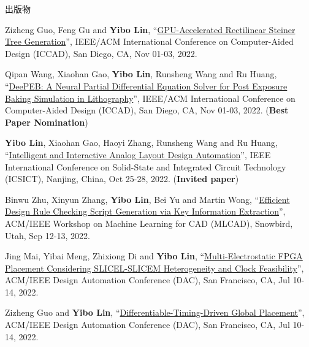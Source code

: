 \begin{rSection}{出版物}
\begin{description}[font=\normalfont, rightmargin=2em]
{}
            

\item[{[C69]}]{
        Zizheng Guo, Feng Gu and \textbf{Yibo Lin}, 
    ``\href{https://doi.org/10.1145/3508352.3549434}{GPU-Accelerated Rectilinear Steiner Tree Generation}'', 
    IEEE/ACM International Conference on Computer-Aided Design (ICCAD), San Diego, CA, Nov 01-03, 2022.
    
}
            

\item[{[C68]}]{
        Qipan Wang, Xiaohan Gao, \textbf{Yibo Lin}, Runsheng Wang and Ru Huang, 
    ``\href{https://doi.org/10.1145/3508352.3549398}{DeePEB: A Neural Partial Differential Equation Solver for Post Exposure Baking Simulation in Lithography}'', 
    IEEE/ACM International Conference on Computer-Aided Design (ICCAD), San Diego, CA, Nov 01-03, 2022.
    (\textbf{Best Paper Nomination})
}
            

\item[{[C67]}]{
        \textbf{Yibo Lin}, Xiaohan Gao, Haoyi Zhang, Runsheng Wang and Ru Huang, 
    ``\href{https://doi.org/10.1109/ICSICT55466.2022.9963217}{Intelligent and Interactive Analog Layout Design Automation}'', 
    IEEE International Conference on Solid-State and Integrated Circuit Technology (ICSICT), Nanjing, China, Oct 25-28, 2022.
    (\textbf{Invited paper})
}
            

\item[{[C66]}]{
        Binwu Zhu, Xinyun Zhang, \textbf{Yibo Lin}, Bei Yu and Martin Wong, 
    ``\href{https://doi.org/10.1145/3551901.3556494}{Efficient Design Rule Checking Script Generation via Key Information Extraction}'', 
    ACM/IEEE Workshop on Machine Learning for CAD (MLCAD), Snowbird, Utah, Sep 12-13, 2022.
    
}
            

\item[{[C65]}]{
        Jing Mai, Yibai Meng, Zhixiong Di and \textbf{Yibo Lin}, 
    ``\href{https://doi.org/10.1145/3489517.3530568}{Multi-Electrostatic FPGA Placement Considering SLICEL-SLICEM Heterogeneity and Clock Feasibility}'', 
    ACM/IEEE Design Automation Conference (DAC), San Francisco, CA, Jul 10-14, 2022.
    
}
            

\item[{[C64]}]{
        Zizheng Guo and \textbf{Yibo Lin}, 
    ``\href{https://doi.org/10.1145/3489517.3530486}{Differentiable-Timing-Driven Global Placement}'', 
    ACM/IEEE Design Automation Conference (DAC), San Francisco, CA, Jul 10-14, 2022.
    
}
\end{description}
\end{rSection}

